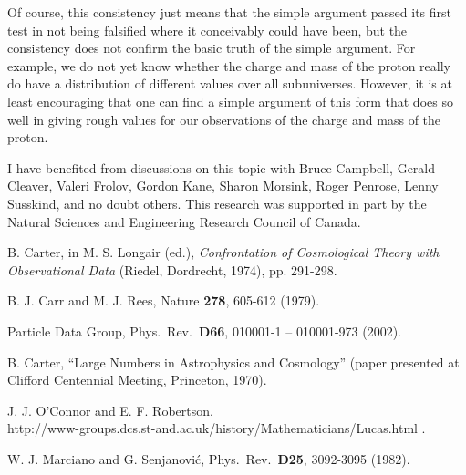 \documentclass[a4paper,12pt]{article}
\begin{document}
	Of course, this consistency just means that the simple argument
passed its first test in not being falsified
where it conceivably could have been,
but the consistency does not confirm the basic truth
of the simple argument.
For example, we do not yet know whether the charge and mass of the proton
really do have a distribution of different values over all subuniverses.
However, it is at least encouraging that one can find a simple argument
of this form that does so well in giving rough values for our
observations of the charge and mass of the proton.

	I have benefited from discussions on this topic with Bruce
Campbell, Gerald Cleaver, Valeri Frolov, Gordon Kane, Sharon Morsink,
Roger Penrose, Lenny Susskind, and no doubt others.  This research was
supported in part by the Natural Sciences and Engineering Research Council
of Canada.



\baselineskip 4pt

\begin{thebibliography}{99}

  B. Carter,
in M. S. Longair (ed.),
{\em Confrontation of Cosmological Theory with Observational Data}
(Riedel, Dordrecht, 1974), pp. 291-298.

  B. J. Carr and M. J. Rees,
Nature {\bf 278}, 605-612 (1979).

  Particle Data Group,
Phys.\ Rev.\ {\bf D66}, 010001-1 -- 010001-973 (2002).

  B. Carter,
``Large Numbers in Astrophysics and Cosmology''
(paper presented at Clifford Centennial Meeting, Princeton, 1970).

  J. J. O'Connor and E. F. Robertson,\\
http://www-groups.dcs.st-and.ac.uk/\myHighlight{$\sim$}\coordHE{}history/Mathematicians/Lucas.html .

  W. J. Marciano and G. Senjanovi\'c,
Phys.\ Rev.\ {\bf D25}, 3092-3095 (1982).



\end{thebibliography}
\end{document}

